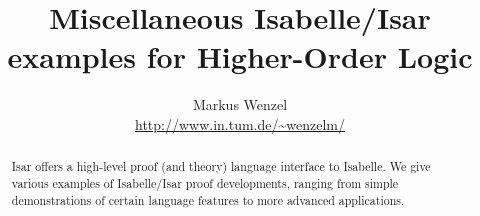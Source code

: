 





\title{Miscellaneous Isabelle/Isar examples for Higher-Order Logic}
\author{Markus Wenzel \\ \url{http://www.in.tum.de/~wenzelm/}}
\maketitle

\begin{abstract}
  Isar offers a high-level proof (and theory) language interface to Isabelle.
  We give various examples of Isabelle/Isar proof developments, ranging from
  simple demonstrations of certain language features to more advanced
  applications.
\end{abstract}

\tableofcontents



